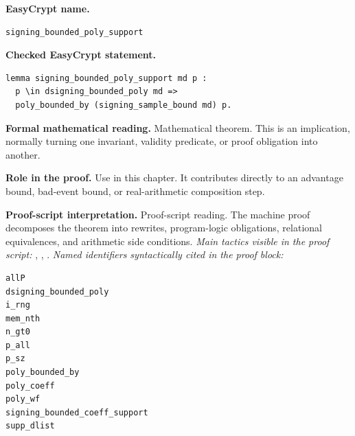 \begin{formaltheorem}
\noindent\textbf{EasyCrypt name.}
\begin{lstlisting}[language=EasyCrypt,basicstyle=\ttfamily\scriptsize]
signing_bounded_poly_support
\end{lstlisting}
\noindent\textbf{Checked EasyCrypt statement.}
\begin{lstlisting}[language=EasyCrypt,basicstyle=\ttfamily\scriptsize]
lemma signing_bounded_poly_support md p :
  p \in dsigning_bounded_poly md =>
  poly_bounded_by (signing_sample_bound md) p.
\end{lstlisting}
\noindent\textbf{Formal mathematical reading.}
Mathematical theorem. This is an implication, normally turning one invariant, validity predicate, or proof obligation into another.

\noindent\textbf{Role in the proof.}
Use in this chapter. It contributes directly to an advantage bound, bad-event bound, or real-arithmetic composition step.

\noindent\textbf{Proof-script interpretation.}
Proof-script reading. The machine proof decomposes the theorem into rewrites, program-logic obligations, relational equivalences, and arithmetic side conditions.
\emph{Main tactics visible in the proof script:} , , .
\emph{Named identifiers syntactically cited in the proof block:}
\begin{lstlisting}[language=EasyCrypt,basicstyle=\ttfamily\scriptsize]
allP
dsigning_bounded_poly
i_rng
mem_nth
n_gt0
p_all
p_sz
poly_bounded_by
poly_coeff
poly_wf
signing_bounded_coeff_support
supp_dlist
\end{lstlisting}

\end{formaltheorem}

